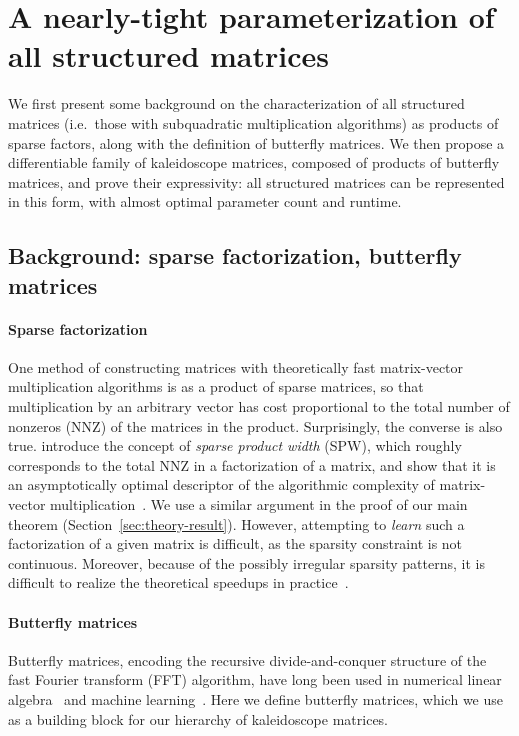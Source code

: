 \section{A nearly-tight parameterization of all structured matrices}
\label{sec:theory}

We first present some background on the characterization of all structured matrices
(i.e.\ those with subquadratic multiplication algorithms) as products of sparse factors, along with the definition of butterfly matrices. We then propose a differentiable family of kaleidoscope matrices, composed of products of butterfly matrices, and prove their expressivity: all structured matrices can be represented in this form, with almost optimal parameter count and runtime. 

\subsection{Background: sparse factorization, butterfly matrices}
\label{sec:background}

\paragraph{Sparse factorization} One method of constructing matrices with theoretically fast matrix-vector multiplication algorithms is as a product of sparse matrices, so that multiplication by an arbitrary vector has cost proportional to the total number of nonzeros (NNZ) of the matrices in the product. Surprisingly, the converse is also true. \cite{desa2018two} introduce the concept of \textit{sparse product width} (SPW), which roughly corresponds to the total NNZ in a factorization of a matrix, and show that it is an asymptotically optimal descriptor of the algorithmic complexity of matrix-vector multiplication~\citep{burgisser2013algebraic}. We use a similar argument in the proof of our main theorem
(Section~\ref{sec:theory-result}).
However, attempting to \textit{learn} such a factorization of a given matrix is difficult, as the sparsity constraint is not continuous. Moreover, because of the possibly irregular sparsity patterns, it is difficult to realize the theoretical speedups in
practice~\citep{gray2017gpu, gahvari2007benchmarking}.

\paragraph{Butterfly matrices} Butterfly matrices, encoding the recursive divide-and-conquer structure of the fast Fourier transform (FFT) algorithm, have long been used in numerical linear algebra~\citep{parker1995random, li2015butterfly} and machine learning~\citep{mathieu2014fast, jing2017tunable, munkhoeva2018quadrature, dao2019learning, choromanski2019unifying}. Here we define butterfly matrices, which we use as a building block for our hierarchy of kaleidoscope matrices.

